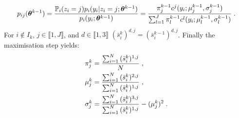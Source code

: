 \begin{exmp}
\begin{equation}\label{gmm:condexpect}
p_{ij}(\bm{\theta}^{k-1}) =\frac{\mathbb{P}_i(z_i = j)p_i(y_i|z_i=j;\bm{\theta}^{k-1})}{p_i(y_i; \bm{\theta}^{k-1})}=\frac{\pi_j^{k-1} c^j(y_i;\mu^{k-1}_j,\sigma^{k-1}_j)}{\sum_{l=1}^{J}\pi_l^{k-1}c^l(y_i;\mu_l^{k-1}, \sigma_l^{k-1})}\;.
\end{equation}
For $i \notin I_k$, $j \in \llbracket 1, J \rrbracket$, and $d \in \llbracket 1,3 \rrbracket$ $(\bar{s}_i^k)^{d,j} = (\bar{s}_i^{k-1})^{d,j}$.
Finally the maximisation step yields:
\begin{align}
& \pi_j^k = \frac{\sum_{i=1}^{N}{(\bar{s}_i^k)^{1,j}}}{N}\;,\\
& \mu_j^k = \frac{\sum_{i=1}^{N}{(\bar{s}_i^k)^{2,j}}}{\sum_{i=1}^{N}{(\bar{s}_i^k)^{1,j}}} \;,\\
& \sigma_j^k = \frac{\sum_{i=1}^{N}{(\bar{s}_i^k)^{3,j}}}{\sum_{i=1}^{N}{(\bar{s}_i^k)^{1,j}}} - (\mu_j^k)^2\;.
\end{align}
\end{exmp}
